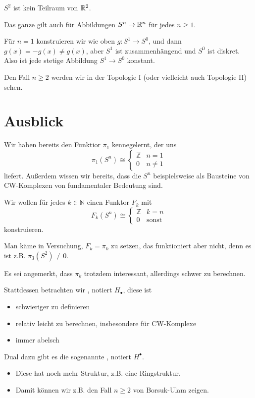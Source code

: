 \begin{corollary}
    $S^2$ ist kein Teilraum von $\mathbb{R}^2$.
\end{corollary}

\begin{remark}
    Das ganze gilt auch für Abbildungen $S^n \to  \mathbb{R}^n$ für jedes $n\geq 1$.

    Für $n=1$ konstruieren wir wie oben  $g\colon  S^1 \to  S^0$, und dann $g(x) = -g(x) \neq  g(x)$, aber $S^1$ ist zusammenhängend und  $S^0$ ist diskret. Also ist jede stetige Abbildung  $S^1 \to  S^0$ konstant.

    Den Fall $n\geq 2$ werden wir in der Topologie I (oder vielleicht auch Topologie II) sehen.
\end{remark}

\section{Ausblick}
Wir haben bereits den Funktior $\pi_1$ kennegelernt, der uns
\[
    \pi_1(S^n) \cong \begin{cases}
        \mathbb{Z} & n = 1 \\
        0 & n \neq 1
    \end{cases}
\] 
liefert. Außerdem wissen wir bereits, dass die $S^n$ beispielsweise als Bausteine von CW-Komplexen von fundamentaler Bedeutung sind.

 \begin{goal}
     Wir wollen für jedes $k\in \mathbb{N}$ einen Funktor $F_k$ mit 
     \[
         F_k(S^n) \cong \begin{cases}
             \mathbb{Z} & k = n \\
             0 & \text{sonst}
         \end{cases}
     \]
     konstruieren.
\end{goal}

\begin{warning}
    Man käme in Versuchung, $F_k = \pi_k$ zu setzen, das funktioniert aber nicht, denn es ist z.B. $\pi_3(S^2) \neq  0$.
\end{warning}

Es sei angemerkt, dass $\pi_k$ trotzdem interessant, allerdings  schwer zu berechnen.

Stattdessen betrachten wir , notiert $H_{\bullet}$, diese ist
\begin{itemize}
    \item schwieriger zu definieren
    \item relativ leicht zu berechnen, insbesondere für CW-Komplexe
    \item immer abelsch
\end{itemize}
Dual dazu gibt es die sogenannte , notiert $H^{\bullet}$.
\begin{itemize}
    \item Diese hat noch mehr Struktur, z.B. eine Ringstruktur.
    \item Damit können wir z.B. den Fall $n\geq 2$ von Borsuk-Ulam zeigen.
\end{itemize}

